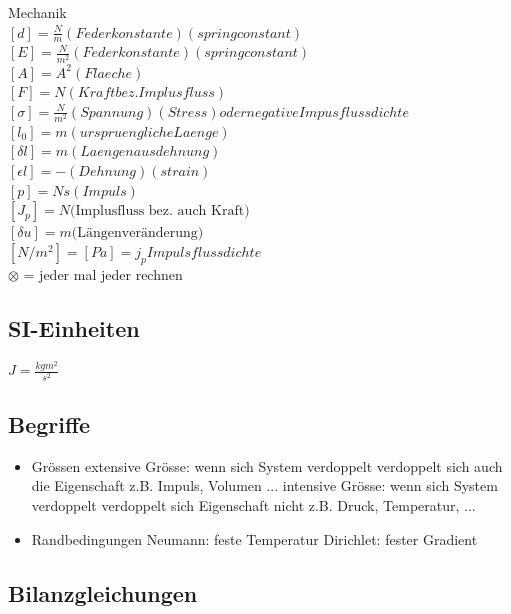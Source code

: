 \documentclass[a4paper]{scrartcl}
\begin{document}
Mechanik\\
$ [d]=\frac{N}{m} (Federkonstante)(spring constant)$\\
$ [E]=\frac{N}{m^2} (Federkonstante)(spring constant)$\\
$ [A]=A^2 (Flaeche)$\\
$ [F]=N (Kraft bez. Implusfluss)$\\
$ [\sigma]=\frac{N}{m^2} (Spannung)(Stress)oder negative Impusflussdichte$\\
$ [l_0]=m (urspruengliche Laenge)$\\
$ [\delta l]=m (Laengenausdehnung)$\\
$ [\epsilon l]=- (Dehnung)(strain)$\\
$ [p]=Ns (Impuls)$\\
$ [J_p]  = N \text{(Implusfluss bez. auch Kraft)} $\\
$ [\delta u] = m \text{(Längenveränderung)}$\\
$ [N/m^2] = [Pa] = j_p Impulsflussdichte$\\



$ \otimes $ = jeder mal jeder rechnen




\subsection{SI-Einheiten}
$ J = \frac{kg m^2}{s^2} $\\

\subsection{Begriffe}
\begin{itemize}
\item Grössen
\subitem extensive Grösse: wenn sich System verdoppelt verdoppelt sich auch die Eigenschaft z.B. Impuls, Volumen ...
\subitem intensive Grösse: wenn sich System verdoppelt verdoppelt sich Eigenschaft nicht z.B. Druck, Temperatur, ...
\item Randbedingungen
\subitem Neumann: feste Temperatur
\subitem Dirichlet: fester Gradient
\end{itemize}


\subsection{Bilanzgleichungen}
\end{document}
